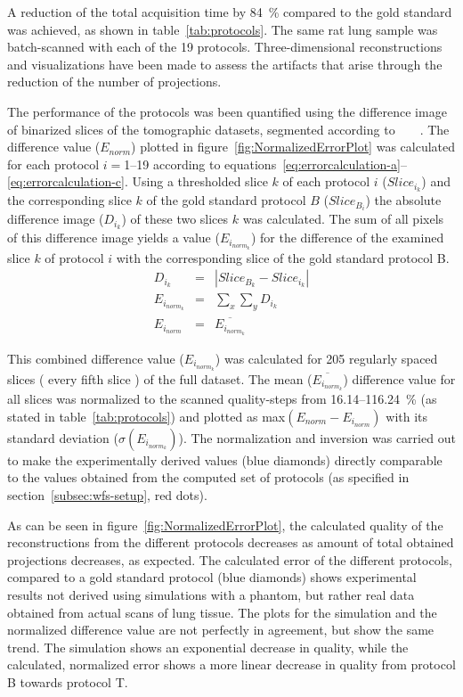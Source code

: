 A reduction of the total acquisition time by \SI{84}{\percent} compared to the gold standard was achieved, as shown in table~\ref{tab:protocols}. The same rat lung sample was batch-scanned with each of the 19 protocols. Three-dimensional reconstructions and visualizations have been made to assess the artifacts that arise through the reduction of the number of projections.

The performance of the protocols was been quantified using the difference image of binarized slices of the tomographic datasets, segmented according to%
\ifhtml%
	~\citet{Otsu1979}%
\else%
	~%
\fi%
. The difference value ($E_{norm}$) plotted in figure~\ref{fig:NormalizedErrorPlot} was calculated for each protocol $i=$1--19 according to equations~\ref{eq:errorcalculation-a}--\ref{eq:errorcalculation-c}. Using a thresholded slice $k$ of each protocol $i$ ($Slice_{i_{k}}$) and the corresponding slice $k$ of the gold standard protocol $B$ ($Slice_{B_{i}}$) the absolute difference image ($D_{i_{k}}$) of these two slices $k$ was calculated. The sum of all pixels of this difference image yields a value ($E_{i_{norm_{k}}}$) for the difference of the examined slice $k$ of protocol $i$ with the corresponding slice of the gold standard protocol B.
\begin{eqnarray}%
	D_{i_{k}} &=& |Slice_{B_{k}}-Slice_{i_{k}}|\label{eq:errorcalculation-a}\\%
	E_{i_{norm_{k}}} &=& \sum_{x}\sum_{y} D_{i_{k}}\label{eq:errorcalculation-b}\\%
	E_{i_{norm}} &=& \overline{E_{i_{norm_{k}}}}\label{eq:errorcalculation-c}%
\end{eqnarray}%

This combined difference value ($E_{i_{norm_{k}}}$) was calculated for 205 regularly spaced slices (%
every fifth slice%
) of the full dataset. The mean ($\overline{E_{i_{norm_{k}}}}$) difference value for all slices was normalized to the scanned quality-steps from 16.14--\SI{116.24}{\percent} (as stated in table~\ref{tab:protocols}) and plotted as max$(E_{norm}-E_{i_{norm}})$ with its standard deviation ($\sigma(E_{i_{norm_{k}}})$). The normalization and inversion was carried out to make the experimentally derived values (blue diamonds) directly comparable to the values obtained from the computed set of protocols (as specified in section~\ref{subsec:wfs-setup}, red dots).

As can be seen in figure~\ref{fig:NormalizedErrorPlot}, the calculated quality of the reconstructions from the different protocols decreases as amount of total obtained projections decreases, as expected. The calculated error of the different protocols, compared to a gold standard protocol (blue diamonds) shows experimental results not derived using simulations with a phantom, but rather real data obtained from actual scans of lung tissue. The plots for the simulation and the normalized difference value are not perfectly in agreement, but show the same trend. The simulation shows an exponential decrease in quality, while the calculated, normalized error shows a more linear decrease in quality from protocol B towards protocol T.


